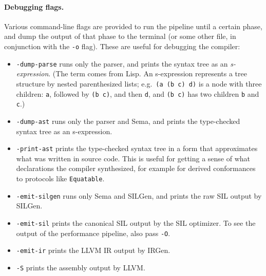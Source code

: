 \documentclass[../generics]{subfiles}
\begin{document}
\begin{figure}\label{compilerpipeline}
\begin{center}
\end{center}
\end{figure}

\paragraph{Debugging flags.}
Various command-line flags are provided to run the pipeline until a certain phase, and dump the output of that phase to the terminal (or some other file, in conjunction with the \texttt{-o} flag). These are useful for debugging the compiler:
\begin{itemize}
\item {}\texttt{-dump-parse} runs only the parser, and prints the syntax tree as an \emph{s-expression}. (The term comes from Lisp. An s-expression represents a tree structure by nested parenthesized lists; e.g.\ \texttt{(a (b c) d)} is a node with three children: \texttt{a}, followed by \texttt{(b c)}, and then \texttt{d}, and \texttt{(b c)} has two children \texttt{b} and \texttt{c}.)
\item {}\texttt{-dump-ast} runs only the parser and Sema, and prints the type-checked syntax tree as an s-expression.
\item {}\texttt{-print-ast} prints the type-checked syntax tree in a form that approximates what was written in source code. This is useful for getting a sense of what declarations the compiler synthesized, for example for derived conformances to protocols like \texttt{Equatable}.
\item {}\texttt{-emit-silgen} runs only Sema and SILGen, and prints the raw SIL output by SILGen.
\item {}\texttt{-emit-sil} prints the canonical SIL output by the SIL optimizer. To see the output of the performance pipeline, also pass \texttt{-O}.
\item {}\texttt{-emit-ir} prints the LLVM IR output by IRGen.
\item {}\texttt{-S} prints the assembly output by LLVM.
\end{itemize}
\end{document}
